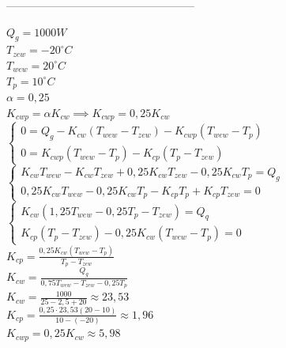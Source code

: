 \documentclass{article}
\begin{document}
---------------------------------------------------
\begin{center}
    $Q_{g}=1000W$ \\
    $T_{zew}=-20^{\circ}C$\\
    $T_{wew}=20^{\circ}C$\\
    $T_{p}=10^{\circ}C$\\
    $\alpha=0,25$\\
    $K_{cwp}=\alpha K_{cw} \implies K_{cwp}=0,25K_{cw}$\\
    \vspace{1ex}
    $
    \begin{cases}
        0=Q_{g} -K_{cw} (T_{wew} - T_{zew})-K_{cwp} (T_{wew} -T_{p})\\
        0=K_{cwp}(T_{wew}-T_{p})-K_{cp}(T_{p}-T_{zew})
    \end{cases}
    $
    \vspace{1ex}
    $
    \begin{cases}
        K_{cw}T_{wew}-K_{cw}T_{zew}+0,25K_{cw}T_{zew}-0,25K_{cw}T_{p}=Q_{g}\\
        0,25K_{cw}T_{wew}-0,25K_{cw}T_{p}-K_{cp}T_{p}+K_{cp}T_{zew}=0
    \end{cases}
    $
    \vspace{1ex}
    $
    \begin{cases}
        K_{cw}(1,25T_{wew}-0,25T_{p}-T_{zew})=Q_{q}\\
        K_{cp}(T_{p}-T_{zew})-0,25K_{cw}(T_{wew}-T_{p})=0
    \end{cases}
    $
    \vspace{1ex}
    \\
    $
    K_{cp}=\frac{0,25K_{cw}(T_{wew}-T_{p})}{T_{p}-T_{zew}}
    $
    \\
    \vspace{1ex}
    $
    K_{cw}=\frac{Q_{g}}{0,75T_{wew}-T_{zew}-0,25T_{p}}
    $
    \\
    \vspace{1ex}
    $
    K_{cw}=\frac{1000}{25-2,5+20}\approx 23,53
    $
    \\
    \vspace{1ex}
    $
    K_{cp}=\frac{0,25 \cdot 23,53(20-10)}{10-(-20)}\approx1,96
    $
    \\
    \vspace{1ex}
    $
    K_{cwp}=0,25K_{cw}\approx 5,98
    $


\end{center}
\end{document}
